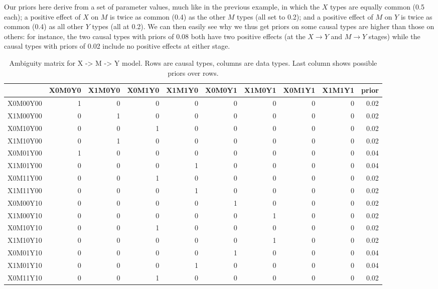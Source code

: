 \documentclass[
  12pt,
]{book}
\begin{document}
Our priors here derive from a set of parameter values, much like in the previous example, in which the \(X\) types are equally common (0.5 each); a positive effect of \(X\) on \(M\) is twice as common (0.4) as the other \(M\) types (all set to 0.2); and a positive effect of \(M\) on \(Y\) is twice as common (0.4) as all other \(Y\) types (all at 0.2). We can then easily see why we thus get priors on some causal types are higher than those on others: for instance, the two causal types with priors of 0.08 both have two positive effects (at the \(X \rightarrow Y\) and \(M \rightarrow Y\) stages) while the causal types with priors of 0.02 include no positive effects at either stage.

\begin{table}

\caption{\label{tab:ambiguityXMY}Ambiguity matrix for X -> M -> Y model. Rows are causal types, columns are data types. Last column shows possible priors over rows.}
\centering
\begin{tabular}[t]{l|r|r|r|r|r|r|r|r|r}
\hline
  & X0M0Y0 & X1M0Y0 & X0M1Y0 & X1M1Y0 & X0M0Y1 & X1M0Y1 & X0M1Y1 & X1M1Y1 & prior\\
\hline
X0M00Y00 & 1 & 0 & 0 & 0 & 0 & 0 & 0 & 0 & 0.02\\
\hline
X1M00Y00 & 0 & 1 & 0 & 0 & 0 & 0 & 0 & 0 & 0.02\\
\hline
X0M10Y00 & 0 & 0 & 1 & 0 & 0 & 0 & 0 & 0 & 0.02\\
\hline
X1M10Y00 & 0 & 1 & 0 & 0 & 0 & 0 & 0 & 0 & 0.02\\
\hline
X0M01Y00 & 1 & 0 & 0 & 0 & 0 & 0 & 0 & 0 & 0.04\\
\hline
X1M01Y00 & 0 & 0 & 0 & 1 & 0 & 0 & 0 & 0 & 0.04\\
\hline
X0M11Y00 & 0 & 0 & 1 & 0 & 0 & 0 & 0 & 0 & 0.02\\
\hline
X1M11Y00 & 0 & 0 & 0 & 1 & 0 & 0 & 0 & 0 & 0.02\\
\hline
X0M00Y10 & 0 & 0 & 0 & 0 & 1 & 0 & 0 & 0 & 0.02\\
\hline
X1M00Y10 & 0 & 0 & 0 & 0 & 0 & 1 & 0 & 0 & 0.02\\
\hline
X0M10Y10 & 0 & 0 & 1 & 0 & 0 & 0 & 0 & 0 & 0.02\\
\hline
X1M10Y10 & 0 & 0 & 0 & 0 & 0 & 1 & 0 & 0 & 0.02\\
\hline
X0M01Y10 & 0 & 0 & 0 & 0 & 1 & 0 & 0 & 0 & 0.04\\
\hline
X1M01Y10 & 0 & 0 & 0 & 1 & 0 & 0 & 0 & 0 & 0.04\\
\hline
X0M11Y10 & 0 & 0 & 1 & 0 & 0 & 0 & 0 & 0 & 0.02\\

\end{tabular}
\end{table}
\end{document}
